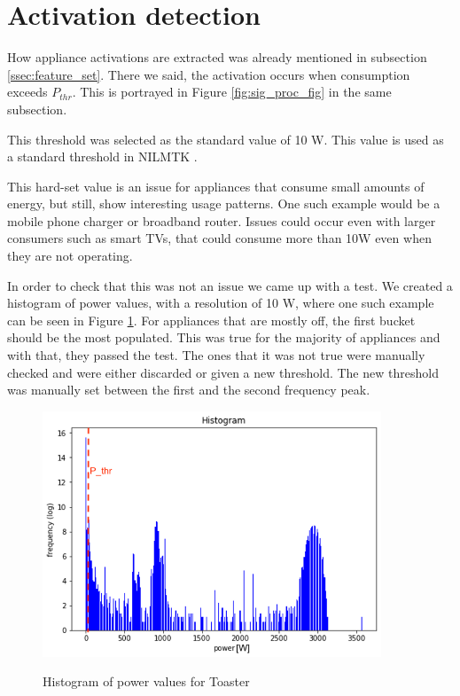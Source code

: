 \section{Activation detection}

How appliance activations are extracted was already mentioned in subsection \ref{ssec:feature_set}.
There we said, the activation occurs when consumption exceeds $P_{thr}$.
This is portrayed in Figure \ref{fig:sig_proc_fig} in the same subsection.

This threshold was selected as the standard value of 10 W.
This value is used as a standard threshold in NILMTK \cite{nilmtk}.

This hard-set value is an issue for appliances that consume small amounts of energy,
but still, show interesting usage patterns.
One such example would be a mobile phone charger or broadband router.
Issues could occur even with larger consumers such as smart TVs, that could consume more than 10W even when they are not operating.

In order to check that this was not an issue we came up with a test.
We created a histogram of power values, with a resolution of 10 W, where one such example can be seen in Figure \ref{fig:freq_pthr}.
For appliances that are mostly off, the first bucket should be the most populated.
This was true for the majority of appliances and with that, they passed the test.
The ones that it was not true were manually checked and were either discarded or given a new threshold.
The new threshold was manually set between the first and the second frequency peak. 

\begin{figure}[H]
	\centering
	\caption{Histogram of power values for Toaster}
	\includegraphics[width=0.9\textwidth]{Figures/profile_sketches/freq_pthr.png}
	\label{fig:freq_pthr}
\end{figure}

